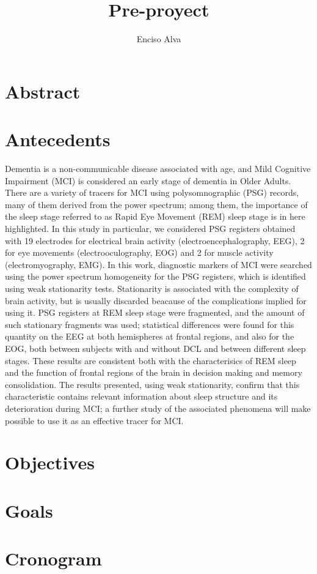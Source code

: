 \documentclass[10pt,a4paper]{article}
\title{Pre-proyect}
\author{Enciso Alva}
\date{}
\begin{document}
\maketitle

\section{Abstract}

\section{Antecedents}

Dementia is a non-communicable disease associated with age, and Mild Cognitive Impairment (MCI) is considered an early stage of dementia in Older Adults. 
%    
There are a variety of tracers for MCI using polysomnographic (PSG) records, many of them derived from the power spectrum; among them, the importance of the sleep stage referred to as Rapid Eye Movement (REM) sleep stage is in here highlighted. 
%
In this study in particular, we considered PSG registers obtained with 19 electrodes for electrical brain activity (electroencephalography, EEG), 2 for eye movements (electrooculography, EOG) and 2 for muscle activity (electromyography, EMG). 
%
In this work, diagnostic markers of MCI were searched using the power spectrum homogeneity for the PSG registers, which is identified using weak stationarity tests. 
%
Stationarity is associated with the complexity of brain activity, but is usually discarded beacause of the complications implied for using it. 
%
PSG registers at REM sleep stage were fragmented, and the amount of such stationary fragments was used; statistical differences were found for this quantity on the EEG at both hemispheres at frontal regions, and also for the EOG, both between subjects with and without DCL and between different sleep stages. 
%
These results are consistent both with the characterisics of REM sleep and the function of frontal regions of the brain in decision making and memory consolidation. The results presented, using weak stationarity, confirm that this characteristic contains relevant information about sleep structure and its deterioration during MCI; a further study of the associated phenomena will make possible to use it as an effective tracer for MCI.

\section{Objectives}

\section{Goals}

\section{Cronogram}
\end{document}
